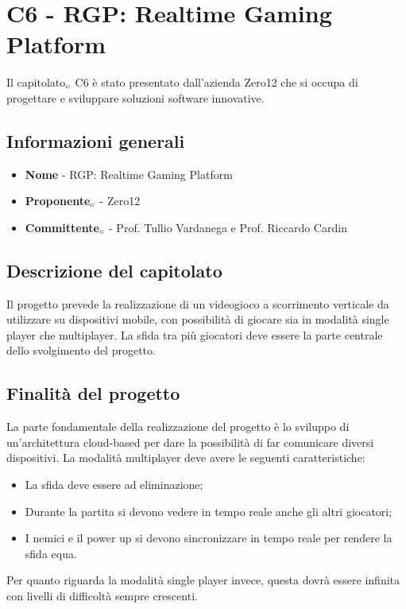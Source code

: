 \chapter{C6 - RGP: Realtime Gaming Platform} \label{CapitolatoC6}
Il capitolato$_{\scaleto{G}{3pt}}$ C6 è stato presentato dall'azienda Zero12 che si occupa di progettare e sviluppare soluzioni software innovative. 
\section{Informazioni generali} \label{C6InformazioniGenerali}
\begin{itemize}
	\item \textbf{Nome} - RGP: Realtime Gaming Platform
	\item \textbf{Proponente}$_{\scaleto{G}{3pt}}$ - Zero12
	\item \textbf{Committente}$_{\scaleto{G}{3pt}}$ - Prof. Tullio Vardanega e Prof. Riccardo Cardin
\end{itemize}
\section{Descrizione del capitolato} \label{C6DescrizioneDelCapitolato}
Il progetto prevede la realizzazione di un videogioco a scorrimento verticale da utilizzare su dispositivi mobile, con possibilità di giocare sia in modalità single player che multiplayer. La sfida tra più giocatori deve essere la parte centrale dello svolgimento del progetto.
\section{Finalità del progetto} \label{C6FinalitàDelProgetto}
La parte fondamentale della realizzazione del progetto è lo sviluppo di un'architettura cloud-based  per dare la possibilità di far comunicare diversi dispositivi. La modalità multiplayer deve avere le seguenti caratteristiche:
\begin{itemize}
	\item La sfida deve essere ad eliminazione;
	\item Durante la partita si devono vedere in tempo reale anche gli altri giocatori;
	\item I nemici e il power up si devono sincronizzare in tempo reale per rendere la sfida equa.
\end{itemize}
Per quanto riguarda la modalità single player invece, questa dovrà essere infinita con livelli di difficoltà sempre crescenti.
